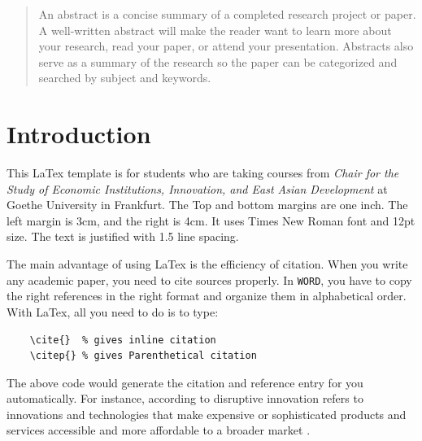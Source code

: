 \documentclass[12pt, a4paper]{article}
\begin{document}
\newpage
\thispagestyle{empty}
\begin{abstract}
    An abstract is a concise summary of a completed research project or paper. 
    A well-written abstract will make the reader want to learn more about your research, 
    read your paper, or attend your presentation. Abstracts also serve as a summary 
    of the research so the paper can be categorized and searched by subject and keywords.
\end{abstract}

\newpage
{}
\setcounter{tocdepth}{2}
\tableofcontents
\listoffigures
\listoftables



\newpage
{}
\setcounter{page}{1}
\section{Introduction}

This LaTex template is for students who are taking courses from \textit{Chair
for the Study of Economic Institutions, Innovation, and East Asian Development}
at Goethe University in Frankfurt. The Top and bottom margins are one inch. The left
margin is 3cm, and the right is 4cm. It uses Times New Roman font and 12pt size.
The text is justified with 1.5 line spacing. 

The main advantage of using LaTex is the efficiency of citation. When you write
any academic paper, you need to cite sources properly. In \texttt{WORD}, you have
to copy the right references in the right format and organize them in alphabetical
order. With LaTex, all you need to do is to type:
\begin{lstlisting}
    \cite{}  % gives inline citation
    \citep{} % gives Parenthetical citation
\end{lstlisting}

The above code would generate the citation and reference entry for you automatically.
For instance, according to \cite{christensen2013disruptive} disruptive innovation
refers to innovations and technologies that make expensive or sophisticated 
products and services accessible and more affordable to a broader market \citep{greenwade93}.
\end{document}
